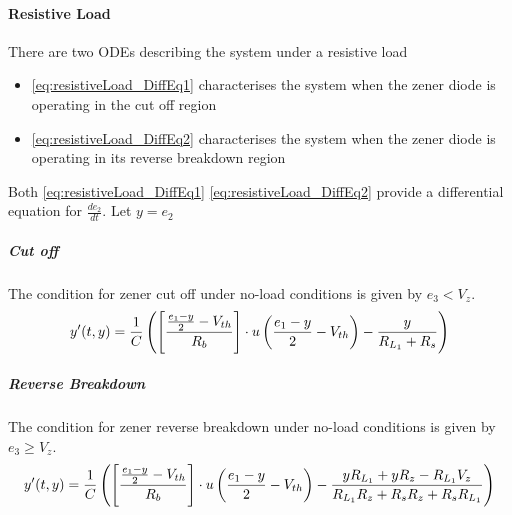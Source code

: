 \paragraph{Resistive Load}
There are two ODEs describing the system under a resistive load
\begin{itemize}
	\item \eqref{eq:resistiveLoad_DiffEq1} characterises the system when the zener diode is operating in the cut off region
	\item \eqref{eq:resistiveLoad_DiffEq2} characterises the system when the zener diode is operating in its reverse breakdown region
\end{itemize}
Both \eqref{eq:resistiveLoad_DiffEq1} \eqref{eq:resistiveLoad_DiffEq2} provide a differential equation for $\frac{de_2}{dt}$. Let $y = e_2$

\subparagraph{Cut off}
The condition for zener cut off under no-load conditions is given by $e_3 < V_z$.
\begin{equation}
	y'(t,y) = \frac{1}{C}\left(\left[\frac{\frac{e_1 - y}{2} - V_{th}}{R_b} \right]\cdot u\left(\frac{e_1 - y}{2} - V_{th} \right) - \frac{y}{R_{L_1} + R_s} \right)
\end{equation}
\subparagraph{Reverse Breakdown}
The condition for zener reverse breakdown under no-load conditions is given by $e_3 \geq V_z$.  
\begin{equation}
	y'(t,y) = \frac{1}{C}\left(\left[\frac{\frac{e_1 - y}{2} - V_{th}}{R_b} \right]\cdot u\left(\frac{e_1 - y}{2} - V_{th} \right) - \frac{y R_{L_1} + y R_z - R_{L_1} V_z}{R_{L_1} R_z + R_s R_z + R_s R_{L_1}} \right)
\end{equation}